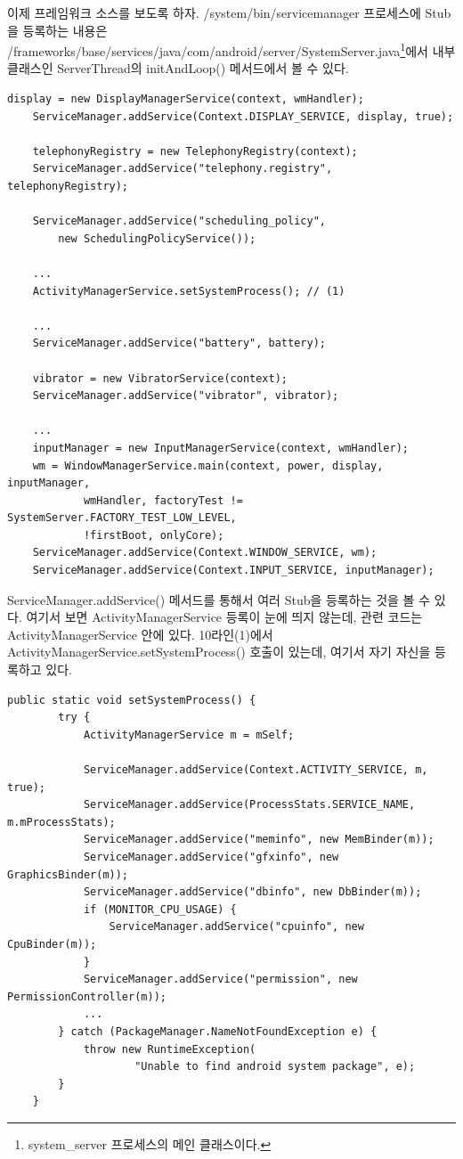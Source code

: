 이제 프레임워크 소스를 보도록 하자.
/system/bin/servicemanager 프로세스에 Stub을 등록하는 내용은 /frameworks/base/services/java/com/android/server/SystemServer.java\footnote{system\_server 프로세스의 메인 클래스이다.}에서 내부 클래스인 ServerThread의 initAndLoop() 메서드에서 볼 수 있다.

\begin{lstlisting}[frame=single, caption=SystemServer.java] 
	display = new DisplayManagerService(context, wmHandler);
	ServiceManager.addService(Context.DISPLAY_SERVICE, display, true);
	
	telephonyRegistry = new TelephonyRegistry(context);
	ServiceManager.addService("telephony.registry", telephonyRegistry);
	
	ServiceManager.addService("scheduling_policy", 
		new SchedulingPolicyService());
		
	...
	ActivityManagerService.setSystemProcess(); // (1)
		
	...
	ServiceManager.addService("battery", battery);
	
	vibrator = new VibratorService(context);
	ServiceManager.addService("vibrator", vibrator);
	
	...
	inputManager = new InputManagerService(context, wmHandler);
	wm = WindowManagerService.main(context, power, display, inputManager,
	        wmHandler, factoryTest != SystemServer.FACTORY_TEST_LOW_LEVEL,
	        !firstBoot, onlyCore);
	ServiceManager.addService(Context.WINDOW_SERVICE, wm);
	ServiceManager.addService(Context.INPUT_SERVICE, inputManager);
\end{lstlisting}	    
ServiceManager.addService() 메서드를 통해서 여러 Stub을 등록하는 것을 볼 수 있다.
여기서 보면 ActivityManagerService 등록이 눈에 띄지 않는데, 관련 코드는 ActivityManagerService 안에 있다. 10라인(1)에서 ActivityManagerService.setSystemProcess() 호출이 있는데, 여기서 자기 자신을 등록하고 있다.\\
\begin{lstlisting}[frame=single, caption=ActivityManagerService.java] 
   public static void setSystemProcess() {
        try {
            ActivityManagerService m = mSelf;

            ServiceManager.addService(Context.ACTIVITY_SERVICE, m, true);
            ServiceManager.addService(ProcessStats.SERVICE_NAME, m.mProcessStats);
            ServiceManager.addService("meminfo", new MemBinder(m));
            ServiceManager.addService("gfxinfo", new GraphicsBinder(m));
            ServiceManager.addService("dbinfo", new DbBinder(m));
            if (MONITOR_CPU_USAGE) {
                ServiceManager.addService("cpuinfo", new CpuBinder(m));
            }
            ServiceManager.addService("permission", new PermissionController(m));
 			...
        } catch (PackageManager.NameNotFoundException e) {
            throw new RuntimeException(
                    "Unable to find android system package", e);
        }
    }
\end{lstlisting}	    



